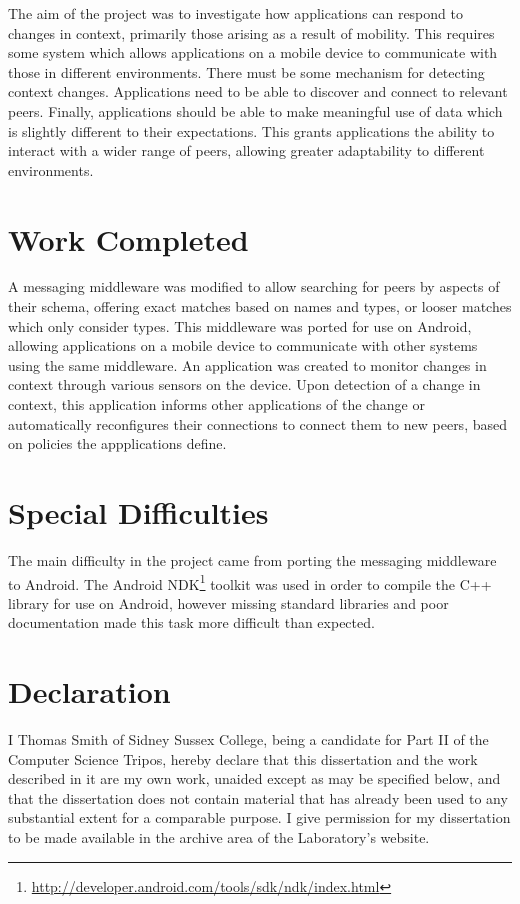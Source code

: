 \documentclass[12pt,twoside,notitlepage]{report}
\begin{document}
The aim of the project was to investigate how applications can respond to changes in context, primarily those arising as a result of mobility. 
This requires some system which allows applications on a mobile device to communicate with those in different environments. 
There must be some mechanism for detecting context changes. 
Applications need to be able to discover and connect to relevant peers. 
Finally, applications should be able to make meaningful use of data which is slightly different to their expectations. 
This grants applications the ability to interact with a wider range of peers, allowing greater adaptability to different environments.

\section*{Work Completed}

A messaging middleware was modified to allow searching for peers by aspects of their schema, offering exact matches based on names and types, or looser matches which only consider types.
This middleware was ported for use on Android, allowing applications on a mobile device to communicate with other systems using the same middleware. 
An application was created to monitor changes in context through various sensors on the device. 
Upon detection of a change in context, this application informs other applications of the change or automatically reconfigures their connections to connect them to new peers, based on policies the appplications define.

\section*{Special Difficulties}

The main difficulty in the project came from porting the messaging middleware to Android. The Android NDK\footnote{\url{http://developer.android.com/tools/sdk/ndk/index.html}} toolkit was used in order to compile the C++ library for use on Android, however missing standard libraries and poor documentation made this task more difficult than expected.
 
\newpage
\section*{Declaration}

I Thomas Smith of Sidney Sussex College, being a candidate for Part II of the Computer
Science Tripos, hereby declare that this dissertation and the work described in it are my own work,
unaided except as may be specified below, and that the dissertation
does not contain material that has already been used to any substantial
extent for a comparable purpose. 
I give permission for my dissertation to be made available in the archive area of the Laboratory's website.
\end{document}
